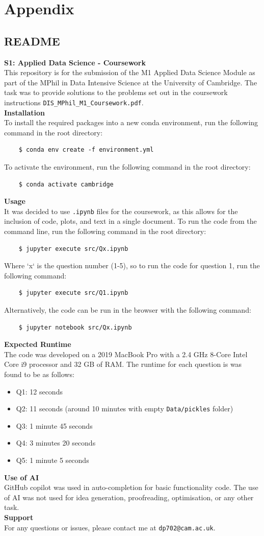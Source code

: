 \documentclass{article}
\begin{document}
\newpage
\section{Appendix}
\subsection{README}
\textbf{S1: Applied Data Science - Coursework}\\
This repository is for the submission of the M1 Applied Data Science Module as part of the MPhil in Data Intensive Science at the University of Cambridge. The task was to provide solutions to the problems set out in the coursework instructions \verb|DIS_MPhil_M1_Coursework.pdf|.\\

\textbf{Installation}\\
To install the required packages into a new conda environment, run the following command in the root directory:
\begin{verbatim}
    $ conda env create -f environment.yml
\end{verbatim}
To activate the environment, run the following command in the root directory:
\begin{verbatim}
    $ conda activate cambridge
\end{verbatim}

\textbf{Usage}\\
It was decided to use \verb|.ipynb| files for the coursework, as this allows for the inclusion of code, plots, and text in a single document. To run the code from the command line, run the following command in the root directory:
\begin{verbatim}
    $ jupyter execute src/Qx.ipynb
\end{verbatim}
Where `x` is the question number (1-5), so to run the code for question 1, run the following command:
\begin{verbatim}
    $ jupyter execute src/Q1.ipynb 
\end{verbatim}
Alternatively, the code can be run in the browser with the following command:
\begin{verbatim}
    $ jupyter notebook src/Qx.ipynb 
\end{verbatim}

\textbf{Expected Runtime}\\
The code was developed on a 2019 MacBook Pro with a 2.4 GHz 8-Core Intel Core i9 processor and 32 GB of RAM. The runtime for each question is was found to be as follows:
\begin{itemize}
    \item Q1: 12 seconds
    \item Q2: 11 seconds (around 10 minutes with empty \verb|Data/pickles| folder)
    \item Q3: 1 minute 45 seconds
    \item Q4: 3 minutes 20 seconds
    \item Q5: 1 minute 5 seconds
\end{itemize}

\textbf{Use of AI}\\
GitHub copilot was used in auto-completion for basic functionality code. The use of AI was not used for idea generation, proofreading, optimisation, or any other task.\\

\textbf{Support}\\
For any questions or issues, please contact me at \verb|dp702@cam.ac.uk|.
\end{document}
